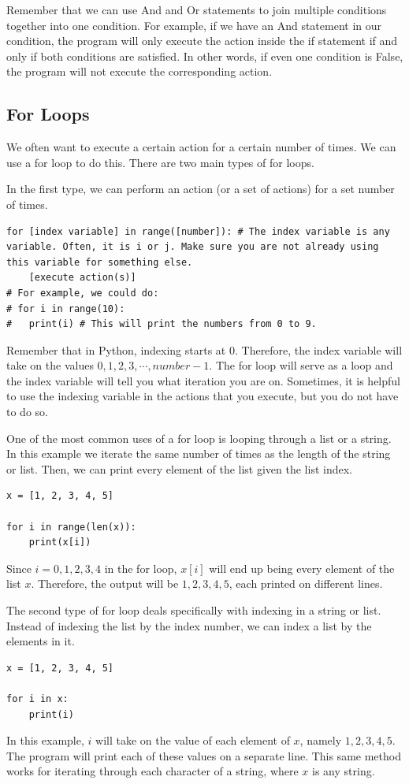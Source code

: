 \documentclass{article}
\begin{document}
Remember that we can use And and Or statements to join multiple conditions together into one condition. For example, if we have an And statement in our condition, the program will only execute the action inside the if statement if and only if both conditions are satisfied. In other words, if even one condition is False, the program will not execute the corresponding action. 

\subsection{For Loops}
We often want to execute a certain action for a certain number of times. We can use a for loop to do this. There are two main types of for loops. 

In the first type, we can perform an action (or a set of actions) for a set number of times. 
\begin{lstlisting}
for [index variable] in range([number]): # The index variable is any variable. Often, it is i or j. Make sure you are not already using this variable for something else. 
    [execute action(s)]
# For example, we could do:
# for i in range(10):
#   print(i) # This will print the numbers from 0 to 9.
\end{lstlisting}
Remember that in Python, indexing starts at 0. Therefore, the index variable will take on the values $0,1,2,3,\cdots,number-1$. The for loop will serve as a loop and the index variable will tell you what iteration you are on. Sometimes, it is helpful to use the indexing variable in the actions that you execute, but you do not have to do so.  

One of the most common uses of a for loop is looping through a list or a string. In this example we iterate the same number of times as the length of the string or list. Then, we can print every element of the list given the list index.
\begin{lstlisting}
x = [1, 2, 3, 4, 5]

for i in range(len(x)):
    print(x[i])
\end{lstlisting}
Since $i=0,1,2,3,4$ in the for loop, $x[i]$ will end up being every element of the list $x$. Therefore, the output will be $1,2,3,4,5$, each printed on different lines. 

The second type of for loop deals specifically with indexing in a string or list. Instead of indexing the list by the index number, we can index a list by the elements in it. 
\begin{lstlisting}
x = [1, 2, 3, 4, 5]

for i in x:
    print(i)
\end{lstlisting}
In this example, $i$ will take on the value of each element of $x$, namely $1,2,3,4,5$. The program will print each of these values on a separate line. This same method works for iterating through each character of a string, where $x$ is any string.
\end{document}
